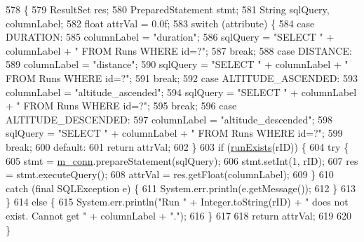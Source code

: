 \begin{DoxyCode}
578                                                                                    \{
579         ResultSet res;
580         PreparedStatement stmt;
581         String sqlQuery, columnLabel;
582         \textcolor{keywordtype}{float} attrVal = 0.0f;
583         \textcolor{keywordflow}{switch} (attribute) \{
584             \textcolor{keywordflow}{case} DURATION:
585                 columnLabel = \textcolor{stringliteral}{"duration"};
586                 sqlQuery = \textcolor{stringliteral}{"SELECT "} + columnLabel + \textcolor{stringliteral}{" FROM Runs WHERE id=?"};
587                 \textcolor{keywordflow}{break};
588             \textcolor{keywordflow}{case} DISTANCE:
589                 columnLabel = \textcolor{stringliteral}{"distance"};
590                 sqlQuery = \textcolor{stringliteral}{"SELECT "} + columnLabel + \textcolor{stringliteral}{" FROM Runs WHERE id=?"};
591                 \textcolor{keywordflow}{break};
592             \textcolor{keywordflow}{case} ALTITUDE\_ASCENDED:
593                 columnLabel = \textcolor{stringliteral}{"altitude\_ascended"};
594                 sqlQuery = \textcolor{stringliteral}{"SELECT "} + columnLabel + \textcolor{stringliteral}{" FROM Runs WHERE id=?"};
595                 \textcolor{keywordflow}{break};
596             \textcolor{keywordflow}{case} ALTITUDE\_DESCENDED:
597                 columnLabel = \textcolor{stringliteral}{"altitude\_descended"};
598                 sqlQuery = \textcolor{stringliteral}{"SELECT "} + columnLabel + \textcolor{stringliteral}{" FROM Runs WHERE id=?"};
599                 \textcolor{keywordflow}{break};
600             \textcolor{keywordflow}{default}:
601                 \textcolor{keywordflow}{return} attrVal;
602         \}
603         \textcolor{keywordflow}{if} (\mbox{\hyperlink{classcom_1_1activitytracker_1_1_d_b_manager_a723ac1c573bacdd0b62894357bd65a9b}{runExists}}(rID)) \{
604             \textcolor{keywordflow}{try} \{
605                 stmt = \mbox{\hyperlink{classcom_1_1activitytracker_1_1_d_b_manager_a064088d13ac09eb147fdc19268771521}{m\_conn}}.prepareStatement(sqlQuery);
606                 stmt.setInt(1, rID);
607                 res = stmt.executeQuery();
608                 attrVal = res.getFloat(columnLabel);
609             \}
610             \textcolor{keywordflow}{catch} (\textcolor{keyword}{final} SQLException e) \{
611                 System.err.println(e.getMessage());
612             \}
613         \}
614         \textcolor{keywordflow}{else} \{
615             System.err.println(\textcolor{stringliteral}{"Run "} + Integer.toString(rID) + \textcolor{stringliteral}{" does not exist. Cannot get "} + 
      columnLabel + \textcolor{stringliteral}{"."});
616         \}
617 
618         \textcolor{keywordflow}{return} attrVal;
619 
620     \}
\end{DoxyCode}
\mbox{\label{classcom_1_1activitytracker_1_1_d_b_manager_a48d9e51c1b73064b8f773cdde5113928}} 
